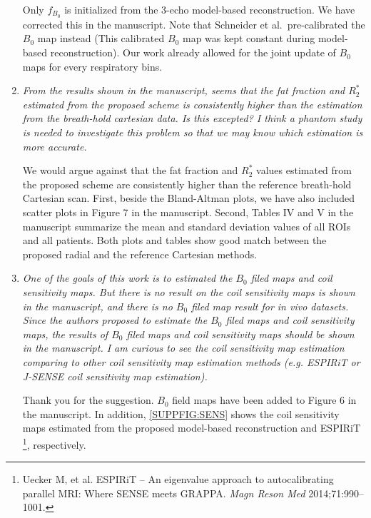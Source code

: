 \documentclass[a4paper,11pt]{report}
\begin{document}
\begin{enumerate}
\hspace{1em} Only $f_{B_0}$ is initialized from the 3-echo model-based reconstruction. 
We have corrected this in the manuscript.  %
Note that Schneider et al.~pre-calibrated the $B_0$ map instead 
(This calibrated $B_0$ map was kept constant during model-based reconstruction). 
Our work already allowed for the joint update of $B_0$ maps for every respiratory bins. 



	\item \textit{From the results shown in the manuscript, seems that the fat fraction and $R_2^*$ estimated from the proposed scheme is consistently higher than the estimation from the breath-hold cartesian data. Is this excepted? I think a phantom study is needed to investigate this problem so that we may know which estimation is more accurate.}

\hspace{1em} We would argue against that the fat fraction and $R_2^*$ values 
estimated from the proposed scheme are consistently higher than 
the reference breath-hold Cartesian scan. First, beside the Bland-Altman plots, 
we have also included scatter plots in Figure 7 in the manuscript. 
Second, Tables IV and V in the manuscript summarize the mean and standard deviation values 
of all ROIs and all patients. 
Both plots and tables show good match between the proposed radial and the reference Cartesian methods.

	\item \textit{One of the goals of this work is to estimated the $B_0$ filed maps and coil sensitivity maps. But there is no result on the coil sensitivity maps is shown in the manuscript, and there is no $B_0$ filed map result for in vivo datasets. Since the authors proposed to estimate the $B_0$ filed maps and coil sensitivity maps, the results of $B_0$ filed maps and coil sensitivity maps should be shown in the manuscript. I am curious to see the coil sensitivity map estimation comparing to other coil sensitivity map estimation methods (e.g. ESPIRiT or J-SENSE coil sensitivity map estimation).}

\hspace{1em} Thank you for the suggestion. $B_0$ field maps have been added to Figure 6 in the manuscript. In addition, \cref{SUPPFIG:SENS} shows the coil sensitivity maps estimated 
from the proposed model-based reconstruction and ESPIRiT 
\footnote{Uecker M, et al. ESPIRiT -- An eigenvalue approach to autocalibrating parallel MRI: Where SENSE meets GRAPPA. \textit{Magn Reson Med} 2014;71:990--1001.}, respectively. 


\end{enumerate}
\end{document}
